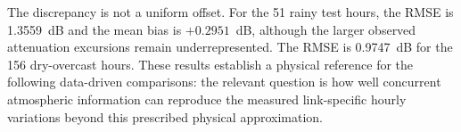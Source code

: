 The discrepancy is not a uniform offset. For the 51 rainy test
hours, the RMSE is 1.3559~dB and the mean bias is $+0.2951$~dB,
although the larger observed attenuation excursions remain
underrepresented. The RMSE is 0.9747~dB for the 156 dry-overcast
hours. These results establish a physical reference for the
following data-driven comparisons: the relevant question is how
well concurrent atmospheric information can reproduce the
measured link-specific hourly variations beyond this prescribed
physical approximation.
